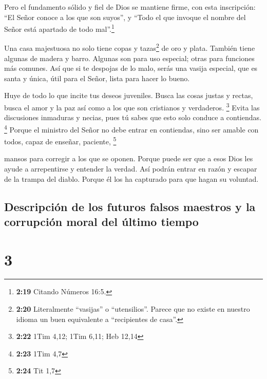  Pero el fundamento sólido y fiel de Dios se mantiene
firme, con esta inscripción: ``El Señor conoce a los que son suyos'', y
``Todo el que invoque el nombre del Señor está apartado de todo
mal''.\footnote{\textbf{2:19} Citando Números 16:5.}

 Una casa majestuosa no solo tiene copas y
tazas\footnote{\textbf{2:20} Literalmente ``vasijas'' o ``utensilios''.
  Parece que no existe en nuestro idioma un buen equivalente a
  ``recipientes de casa''.} de oro y plata. También tiene algunas de
madera y barro. Algunas son para uso especial; otras para funciones más
comunes.  Así que si te despojas de lo malo, serás una
vasija especial, que es santa y única, útil para el Señor, lista para
hacer lo bueno.

 Huye de todo lo que incite tus deseos juveniles. Busca
las cosas justas y rectas, busca el amor y la paz así como a los que son
cristianos y verdaderos. \footnote{\textbf{2:22} 1Tim 4,12; 1Tim 6,11;
  Heb 12,14}  Evita las discusiones inmaduras y necias,
pues tú sabes que esto solo conduce a contiendas. \footnote{\textbf{2:23}
  1Tim 4,7}  Porque el ministro del Señor no debe entrar
en contiendas, sino ser amable con todos, capaz de enseñar, paciente,
\footnote{\textbf{2:24} Tit 1,7}

 mansos para corregir a los que se oponen. Porque puede
ser que a esos Dios les ayude a arrepentirse y entender la verdad.
 Así podrán entrar en razón y escapar de la trampa del
diablo. Porque él los ha capturado para que hagan su voluntad.

\hypertarget{descripciuxf3n-de-los-futuros-falsos-maestros-y-la-corrupciuxf3n-moral-del-uxfaltimo-tiempo}{%
\subsection{Descripción de los futuros falsos maestros y la corrupción
moral del último
tiempo}\label{descripciuxf3n-de-los-futuros-falsos-maestros-y-la-corrupciuxf3n-moral-del-uxfaltimo-tiempo}}

\hypertarget{section-2}{%
\section{3}\label{section-2}}

